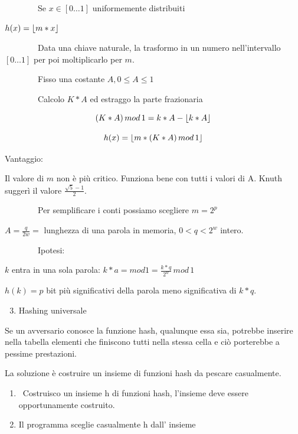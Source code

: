 \documentclass{article}
\DeclarePairedDelimiter\floor{\lfloor}{\rfloor}
\providecommand{\tightlist}{%
  \setlength{\itemsep}{0pt}\setlength{\parskip}{0pt}}
\begin{document}
{~~~~~~~~Se $x \in [0\ldots1]$ uniformemente distribuiti}

$h(x) = \floor*{m*x}$

{~~~~~~~~Data una chiave naturale, la trasformo in un numero nell'intervallo $[0\ldots1]$ per poi moltiplicarlo per $m$.}

{~~~~~~~~Fisso una costante $A, 0 \leq A \leq 1$}

{~~~~~~~~Calcolo $K*A$ ed estraggo la parte frazionaria}

\begin{equation}
(K*A)\,mod\,1 = k * A - \floor*{k*A}
\end{equation}

\begin{equation}
h(x) = \floor*{m*(K*A)\,mod\,1}
\end{equation}

{Vantaggio:}

{Il valore di $m$ non è più critico. Funziona bene con tutti i valori di A. Knuth suggerì il valore $\frac{\sqrt{5}-1}{2}$.}


{~~~~~~~~Per semplificare i conti possiamo scegliere $m=2^p$}

{$A = \frac{q}{2w} = $ lunghezza di una parola in memoria, $0<q<2^w$ intero.}

{~~~~~~~~Ipotesi:}

{$k$ entra in una sola parola: $k*a = mod 1 = \frac{k*q}{2^w}\,mod\,1$}

{$h(k)=p$ bit più significativi della parola meno significativa di $k*q$.}

\begin{enumerate}
\setcounter{enumi}{2}
\tightlist
\item
  {Hashing universale}
\end{enumerate}

{Se un avversario conosce la funzione hash, qualunque essa sia, potrebbe inserire nella tabella elementi che finiscono tutti nella stessa cella e ciò porterebbe a pessime prestazioni.}

{La soluzione è costruire un insieme di funzioni hash da pescare casualmente.}

\begin{enumerate}
\tightlist
\item
  {~Costruisco un insieme h di funzioni hash, l'insieme deve essere
  opportunamente costruito.}
\item
  {Il programma sceglie casualmente h dall' insieme}
\end{enumerate}
\end{document}

